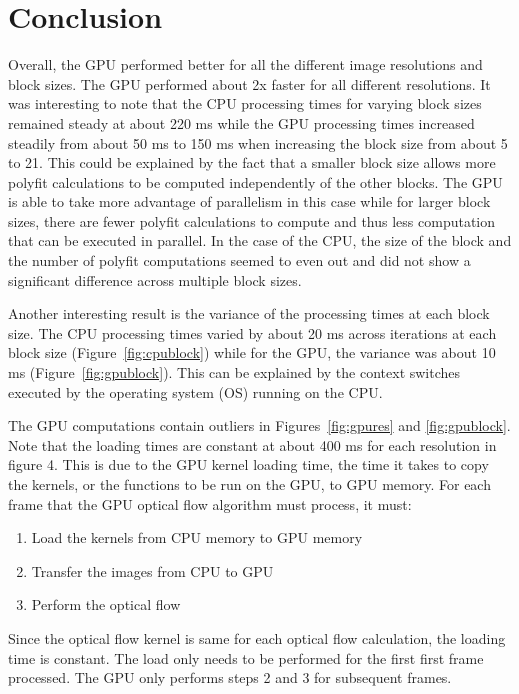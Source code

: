 \documentclass[12pt,letterpaper]{article}
\begin{document}
\section{Conclusion}
Overall, the GPU performed better for all the different image resolutions and
block sizes. The GPU performed about 2x faster for all different resolutions.
It was interesting to note that the CPU processing times for varying block
sizes remained steady at about 220 ms while the GPU processing times
increased steadily from about 50 ms to 150 ms when increasing the block size
from about 5 to 21. This could be explained by the fact that a smaller block
size allows more polyfit calculations to be computed independently of the other
blocks. The GPU is able to take more advantage of parallelism in this case
while for larger block sizes, there are fewer polyfit calculations to compute
and thus less computation that can be executed in parallel. In the case of the
CPU, the size of the block and the number of polyfit computations seemed to
even out and did not show a significant difference across multiple block sizes.

Another interesting result is the variance of the processing times at each
block size. The CPU processing times varied by about 20 ms across iterations at
each block size (Figure~\ref{fig:cpublock}) while for the GPU, the variance was
about 10 ms (Figure~\ref{fig:gpublock}). This can be explained by the context
switches executed by the operating system (OS) running on the CPU.

The GPU computations contain outliers in Figures~\ref{fig:gpures} and
\ref{fig:gpublock}. Note that the loading times are constant at about 400 ms
for each resolution in figure 4. This is due to the GPU kernel loading time,
the time it takes to copy the kernels, or the functions to be run on the GPU,
to GPU memory. For each frame that the GPU optical flow algorithm must process,
it must:

\begin{enumerate}
  \item Load the kernels from CPU memory to GPU memory
  \item Transfer the images from CPU to GPU
  \item Perform the optical flow
\end{enumerate}

Since the optical flow kernel is same for each optical flow calculation, the
loading time is constant. The load only needs to be performed for the first
first frame processed. The GPU only performs steps 2 and 3 for subsequent
frames.
\end{document}
